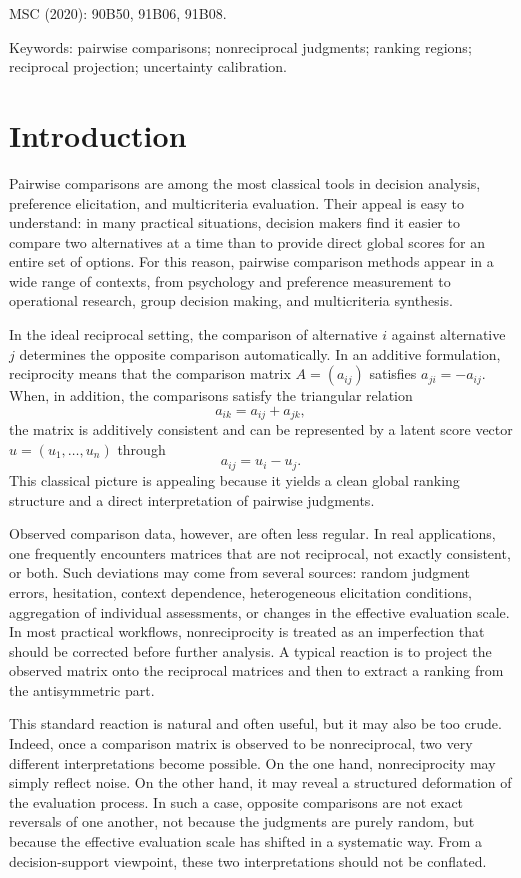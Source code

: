 \documentclass[11pt]{amsart}
\theoremstyle{definition}
\theoremstyle{plain}
\numberwithin{equation}{section}
\begin{document}
MSC (2020): 90B50, 91B06, 91B08.

Keywords: pairwise comparisons; nonreciprocal judgments; ranking regions; reciprocal projection; uncertainty calibration.

\section*{Introduction}

Pairwise comparisons are among the most classical tools in decision analysis, preference elicitation, and multicriteria evaluation. Their appeal is easy to understand: in many practical situations, decision makers find it easier to compare two alternatives at a time than to provide direct global scores for an entire set of options. For this reason, pairwise comparison methods appear in a wide range of contexts, from psychology and preference measurement to operational research, group decision making, and multicriteria synthesis.

In the ideal reciprocal setting, the comparison of alternative $i$ against alternative $j$ determines the opposite comparison automatically. In an additive formulation, reciprocity means that the comparison matrix $A=(a_{ij})$ satisfies
\(
a_{ji}=-a_{ij}.
\)
When, in addition, the comparisons satisfy the triangular relation
\[
a_{ik}=a_{ij}+a_{jk},
\]
the matrix is additively consistent and can be represented by a latent score vector $u=(u_1,\dots,u_n)$ through
\[
a_{ij}=u_i-u_j.
\]
This classical picture is appealing because it yields a clean global ranking structure and a direct interpretation of pairwise judgments.

Observed comparison data, however, are often less regular. In real applications, one frequently encounters matrices that are not reciprocal, not exactly consistent, or both. Such deviations may come from several sources: random judgment errors, hesitation, context dependence, heterogeneous elicitation conditions, aggregation of individual assessments, or changes in the effective evaluation scale. In most practical workflows, nonreciprocity is treated as an imperfection that should be corrected before further analysis. A typical reaction is to project the observed matrix onto the reciprocal matrices and then to extract a ranking from the antisymmetric part.

This standard reaction is natural and often useful, but it may also be too crude. Indeed, once a comparison matrix is observed to be nonreciprocal, two very different interpretations become possible. On the one hand, nonreciprocity may simply reflect noise. On the other hand, it may reveal a structured deformation of the evaluation process. In such a case, opposite comparisons are not exact reversals of one another, not because the judgments are purely random, but because the effective evaluation scale has shifted in a systematic way. From a decision-support viewpoint, these two interpretations should not be conflated.
\end{document}
